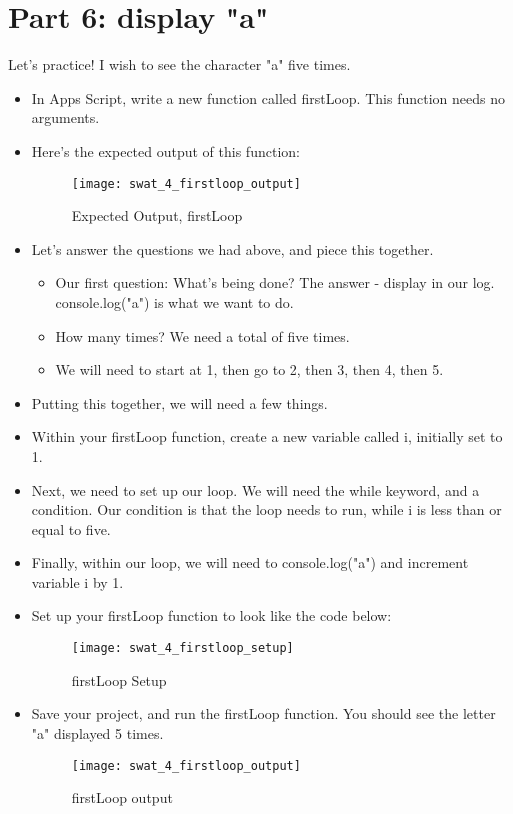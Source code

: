 \documentclass{article}
\begin{document}
\section*{Part 6: display "a"}
Let's practice!  I wish to see the character "a" five times.
\begin{itemize}
	\item In Apps Script, write a new function called firstLoop.  This function needs no arguments.
	\item Here's the expected output of this function:
	\begin{figure}[H]
  		\centering
  		\texttt{[image: swat\_4\_firstloop\_output]}
  		\caption{Expected Output, firstLoop}
	\end{figure}
	\item Let's answer the questions we had above, and piece this together.
	\begin{itemize}
		\item Our first question:  What's being done?  The answer - display in our log.  console.log("a") is what we want to do.
		\item How many times?  We need a total of five times.  
		\item We will need to start at 1, then go to 2, then 3, then 4, then 5.
	\end{itemize}
	\item Putting this together, we will need a few things.  
	\item Within your firstLoop function, create a new variable called i, initially set to 1.
	\item Next, we need to set up our loop.  We will need the while keyword, and a condition.  Our condition is that the loop needs to run, while i is less than or equal to five.
	\item Finally, within our loop, we will need to console.log("a") and increment variable i by 1.
	\item Set up your firstLoop function to look like the code below:
	\begin{figure}[H]
  		\centering
  		\texttt{[image: swat\_4\_firstloop\_setup]}
  		\caption{firstLoop Setup}
	\end{figure}
	\item Save your project, and run the firstLoop function.  You should see the letter "a" displayed 5 times.
	\begin{figure}[H]
  		\centering
  		\texttt{[image: swat\_4\_firstloop\_output]}
  		\caption{firstLoop output}
	\end{figure}
\end{itemize}
\end{document}
